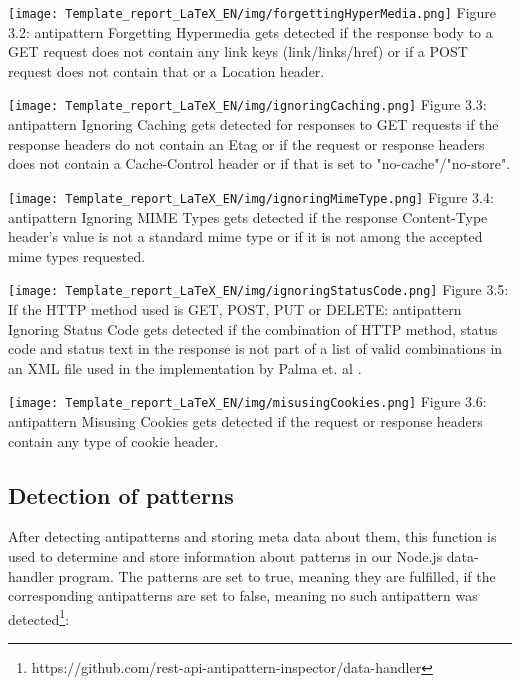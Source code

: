 \documentclass[a4paper,12pt]{article}
\begin{document}
\begin{center}
\texttt{[image: Template\_report\_LaTeX\_EN/img/forgettingHyperMedia.png]}
Figure 3.2: antipattern Forgetting Hypermedia gets detected if the response body to a GET request does not contain any link keys (link/links/href) or if a POST request does not contain that or a Location header.
\end{center}

\begin{center}
\texttt{[image: Template\_report\_LaTeX\_EN/img/ignoringCaching.png]}
Figure 3.3: antipattern Ignoring Caching gets detected for responses to GET requests if the response headers do not contain an Etag or if the request or response headers does not contain a Cache-Control header or if that is set to "no-cache"/"no-store". 
\end{center}

\begin{center}
\texttt{[image: Template\_report\_LaTeX\_EN/img/ignoringMimeType.png]}
Figure 3.4: antipattern Ignoring MIME Types gets detected if the response Content-Type header's value is not a standard mime type or if it is not among the accepted mime types requested. 
\end{center}

\begin{center}
\texttt{[image: Template\_report\_LaTeX\_EN/img/ignoringStatusCode.png]}
Figure 3.5: If the HTTP method used is GET, POST, PUT or DELETE: antipattern Ignoring Status Code gets detected if the combination of HTTP method, status code and status text in the response is not part of a list of valid combinations in an XML file used in the implementation by Palma et. al \cite{linguistic}.
\end{center}

\begin{center}
\texttt{[image: Template\_report\_LaTeX\_EN/img/misusingCookies.png]}
Figure 3.6: antipattern Misusing Cookies gets detected if the request or response headers contain any type of cookie header. 
\end{center}

\subsection{Detection of patterns}

After detecting antipatterns and storing meta data about them, this function is used to determine and store information about patterns in our Node.js data-handler program. The patterns are set to true, meaning they are fulfilled, if the corresponding antipatterns are set to false, meaning no such antipattern was detected\footnote{https://github.com/rest-api-antipattern-inspector/data-handler}:
\end{document}
